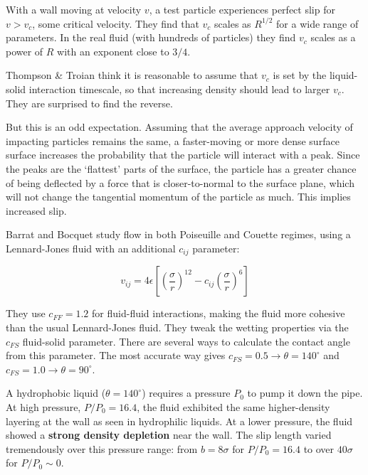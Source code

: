 \documentclass[12pt, a4paper, twoside, openright]{book}
\begin{document}
With a wall moving at velocity $v$, a test particle experiences perfect slip for $v>v_{c}$, some critical velocity. They find that $v_{c}$ scales as $R^{1/2}$ for a wide range of parameters. In the real fluid (with hundreds of particles) they find $v_{c}$ scales as a power of $R$ with an exponent close to $3/4$.

Thompson \& Troian think it is reasonable to assume that $v_{c}$ is set by the liquid-solid interaction timescale, so that increasing density should lead to larger $v_{c}$.  They are surprised to find the reverse.

But this is an odd expectation.  Assuming that the average approach velocity of impacting particles remains the same, a faster-moving or more dense surface surface increases the probability that the particle will interact with a peak.  Since the peaks are the `flattest' parts of the surface, the particle has a greater chance of being deflected by a force that is closer-to-normal to the surface plane, which will not change the tangential momentum of the particle as much.  This implies increased slip.
\vspace*{1em}

Barrat and Bocquet \cite{BarratBocquet1999} study flow in both Poiseuille and  Couette regimes, using a Lennard-Jones fluid with an additional $c_{ij}$ parameter:

\begin{equation}
v_{ij} = 4 \epsilon \left[ \left( \frac{\sigma}{r}\right)^{12}
 - c_{ij} \left( \frac{\sigma}{r} \right)^{6} \right]
\end{equation}


They use $c_{FF} = 1.2$ for fluid-fluid interactions, making the fluid more cohesive than the usual Lennard-Jones fluid. They tweak the wetting properties via the $c_{FS}$ fluid-solid parameter.  There are several ways to calculate the contact angle from this parameter.  The most accurate way gives $c_{FS}=0.5 \rightarrow \theta= 140^{\circ}$ and $c_{FS} = 1.0 \rightarrow \theta = 90^{\circ}$.

A hydrophobic liquid ($\theta = 140^{\circ}$) requires a pressure $P_{0}$ to pump it down the pipe. %
 At high pressure, $P/P_{0}=16.4$, the fluid exhibited the same higher-density layering at the wall as seen in hydrophilic liquids.  At a lower pressure, %
  the fluid showed a \textbf{strong density depletion} near the wall.  The slip length varied tremendously over this pressure range: from $b = 8\sigma$ for $P/P_{0} = 16.4$ to over $40\sigma$ for $P/P_{0} \sim 0$.
\end{document}
